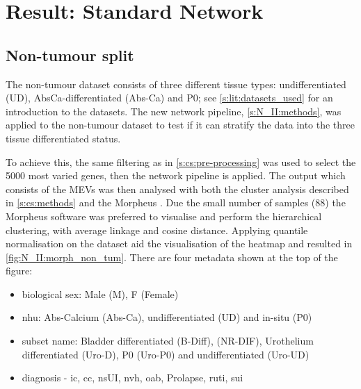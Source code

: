 \section{Result: Standard Network}  \label{s:N_II:std_net}

\vspace{3mm}
\vspace{3mm}

\subsection{Non-tumour split} \label{s:N_II:std}

The non-tumour dataset consists of three different tissue types: undifferentiated (UD), AbsCa-differentiated (Abs-Ca) and P0; see \cref{s:lit:datasets_used} for an introduction to the datasets. The new network pipeline, \cref{s:N_II:methods}, was applied to the non-tumour dataset to test if it can stratify the data into the three tissue differentiated status.

To achieve this, the same filtering as in \cref{s:cs:pre-processing} was used to select the 5000 most varied genes, then the network pipeline is applied. The output which consists of the MEVs was then analysed with both the cluster analysis described in \cref{s:cs:methods} and the Morpheus \cite{Broad-InstituteUnknown-kn}. Due the small number of samples (88) the Morpheus software was preferred to visualise and perform the hierarchical clustering, with average linkage and cosine distance. Applying quantile normalisation on the dataset aid the visualisation of the heatmap and resulted in \cref{fig:N_II:morph_non_tum}. There are four metadata shown at the top of the figure: 
\begin{itemize}
    \item biological sex: Male (M), F (Female)
    \item \acrfull{nhu}: Abs-Calcium (Abs-Ca), undifferentiated (UD) and in-situ (P0)
    \item subset name: Bladder differentiated (B-Diff), (NR-DIF), Urothelium differentiated (Uro-D), P0 (Uro-P0) and undifferentiated (Uro-UD)
    \item diagnosis - \acrfull{ic}, \acrfull{cc}, \acrfull{nsUI},  \acrfull{nvh}, \acrfull{oab}, Prolapse, \acrfull{ruti}, \acrfull{sui}
\end{itemize} 

